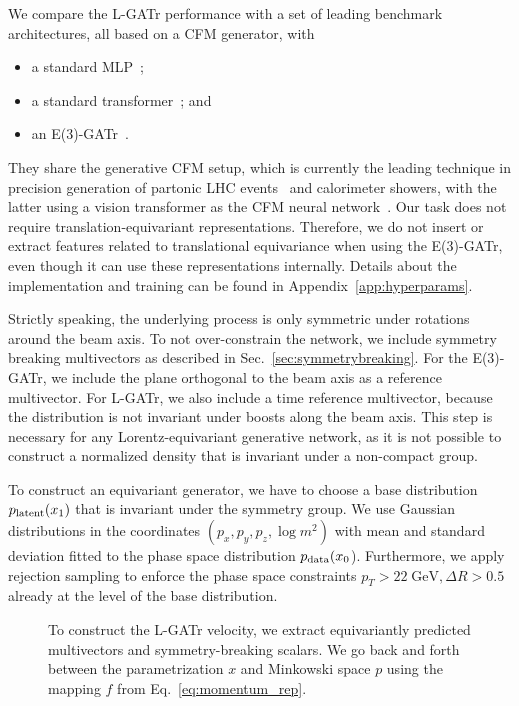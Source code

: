 \documentclass[submission, Phys]{SciPost}
\begin{document}
We compare the L-GATr performance with a set of leading benchmark architectures, all based on a CFM generator, with
%
\begin{itemize}
\item a standard MLP~\cite{Butter:2023fov};
\item a standard transformer~\cite{Huetsch:2024quz}; and
\item an E(3)-GATr~\cite{brehmer2023geometric}.
\end{itemize}
%
They share the generative CFM setup, which is currently the leading technique in precision generation of partonic LHC events~\cite{Butter:2023fov} and calorimeter showers, with the latter using a vision transformer as the CFM neural network~\cite{Favaro:2024rle}. Our task does not require translation-equivariant representations. Therefore, we do not insert or extract features related to translational equivariance when using the E(3)-GATr, even though it can use these representations internally. Details about the implementation and training can be found in Appendix~\ref{app:hyperparams}.

Strictly speaking, the underlying process is only symmetric under rotations around the beam axis. To not over-constrain the network, we include symmetry breaking multivectors as described in Sec.~\ref{sec:symmetrybreaking}. For the E(3)-GATr, we include the plane orthogonal to the beam axis as a reference multivector. For L-GATr, we also include a time reference multivector, because the distribution is not invariant under boosts along the beam axis. This step is necessary for any Lorentz-equivariant generative network, as it is not possible to construct a normalized density that is invariant under a non-compact group. 

To construct an equivariant generator, we have to choose a base distribution $p_\text{latent} (x_1)$ that is invariant under the symmetry group. We use Gaussian distributions in the coordinates $(p_x, p_y, p_z, \log m^2)$ with mean and standard deviation fitted to the phase space distribution $p_\text{data} (x_0$). Furthermore, we apply rejection sampling to enforce the phase space constraints $p_T>22\;\mathrm{GeV}, \Delta R > 0.5$ already at the level of the base distribution. 

\begin{figure}[t]
    \centering
    
    \caption{To construct the L-GATr velocity, we extract \textcolor{gatrgreen}{equivariantly predicted multivectors} and \textcolor{gatrred}{symmetry-breaking scalars}. We go back and forth between the parametrization $x$ and Minkowski space $p$ using the \textcolor{gatrblue}{mapping $f$} from Eq.~\eqref{eq:momentum_rep}.}
    \label{fig:equicfm}
\end{figure}
\end{document}
